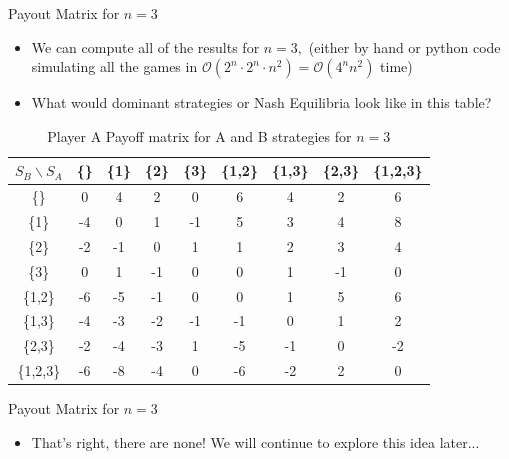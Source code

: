 \documentclass[aspectratio=169]{beamer}
\begin{document}
\begin{frame}{Payout Matrix for $n=3$}
\begin{itemize}
\item We can compute all of the results for $n=3,$ (either by hand or python code simulating all the games in $\mathcal{O}(2^{n}\cdot 2^{n} \cdot n^2) = \mathcal{O}(4^{n}n^{2})$ time)\pause
 \item What would dominant strategies or Nash Equilibria look like in this table? \pause
\end{itemize}
\begin{table}[H]
    \centering
    \begin{tabular}{|c|c|c|c|c|c|c|c|c|}
        \hline
        $S_B \backslash S_A$ & \{\} & \{1\} & \{2\} & \{3\} & \{1,2\} & \{1,3\} & \{2,3\} & \{1,2,3\} \\ 
        \hline
        \{\}      & 0  & 4  & 2  & 0  & 6  & 4  & 2  & 6 \\ \hline 
        \{1\}      & -4 & 0  & 1  & -1 & 5  & 3  & 4  & 8  \\ \hline 
        \{2\}      & -2 & -1 & 0  & 1  & 1  & 2  & 3  & 4  \\ \hline 
        \{3\}      & 0  & 1  & -1 & 0  & 0  & 1 & -1 & 0  \\ \hline 
        \{1,2\}    & -6 & -5 & -1 & 0  & 0  & 1  & 5  & 6  \\ \hline 
        \{1,3\}    & -4 & -3 & -2 & -1 & -1 & 0  & 1  & 2  \\ \hline 
        \{2,3\}    & -2 & -4 & -3 & 1  & -5 & -1 & 0  & -2 \\ \hline 
        \{1,2,3\}  & -6 & -8 & -4 & 0  & -6 & -2 & 2  & 0  \\ \hline 
        \hline
    \end{tabular} 
   \caption{Player A Payoff matrix for A and B strategies for $n=3$}
\end{table}
\end{frame}
\begin{frame}{Payout Matrix for $n=3$}
  \begin{itemize}
      \item That's right, there are none! We will continue to explore this idea later...
  \end{itemize}
\end{frame}
\end{document}
